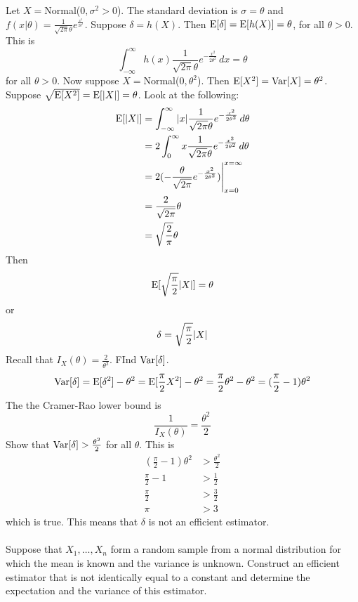 \documentclass[12pt]{article}
\begin{document}
Let $X = $Normal($0,\sigma^2 > 0$). The standard deviation is $\sigma = \theta$ and $f(x | \theta) = \frac{1}{\sqrt{2\pi} \theta} e^{_\frac{x^2}{2\theta^2}}$. Suppose $\delta = h(X)$. Then $\mathrm{E}[ \delta ] = \mathrm{E}[ h(X) ] = \theta$, for all $\theta > 0$. This is $$ \int_{-\infty}^\infty h(x) \frac{1}{\sqrt{2\pi} \theta} e^{-\frac{x^2}{2\theta^2}} \, dx = \theta$$ for all $\theta > 0$. Now suppose $X = $Normal($0, \theta^2$). Then $\mathrm{E}[ X^2 ] = \mathrm{Var}[ X ] = \theta^2$. Suppose $\sqrt{\mathrm{E}[ X^2 ]} = \mathrm{E}[ \abs{X} ] = \theta$. Look at the following: $$ \begin{aligned} \mathrm{E}[ \abs{X} ] &= \int_{-\infty}^\infty \abs{x} \frac{1}{\sqrt{2\pi} \theta} e^{-\frac{x^2}{2\theta^2}} \, d\theta \\ &= 2\int_0^\infty x \frac{1}{\sqrt{2\pi} \theta}e^{-\frac{x^2}{2\theta^2}} \, d\theta \\ &= 2( -\frac{\theta}{\sqrt{2\pi}} e^{-\frac{x^2}{2\theta^2}})\Bigg|_{x=0}^{x=\infty} \\ &= \frac{2}{\sqrt{2\pi}} \theta \\ &= \sqrt{\frac{2}{\pi}} \theta \end{aligned} $$ Then $$ \mathrm{E}[ \sqrt{\frac{\pi}{2}} \abs{X} ] = \theta $$ or $$ \delta = \sqrt{\frac{\pi}{2}}\abs{X} $$ Recall that $I_X(\theta) = \frac{2}{\theta^2}$. FInd $\mathrm{Var}[ \delta ]$. $$ \mathrm{Var}[ \delta ] = \mathrm{E}[ \delta^2 ] - \theta^2 = \mathrm{E}[ \frac{\pi}{2}X^2 ] - \theta^2 = \frac{\pi}{2}\theta^2 - \theta^2 = (\frac{\pi}{2} - 1)\theta^2 $$ The the Cramer-Rao lower bound is $$ \frac{1}{I_X(\theta)} = \frac{\theta^2}{2}$$ Show that $\mathrm{Var}[ \delta ] > \frac{\theta^2}{2}$ for all $\theta$. This is $$ \begin{aligned} (\frac{\pi}{2} - 1)\theta^2 &> \frac{\theta^2}{2} \\ \frac{\pi}{2} - 1 &> \frac{1}{2} \\ \frac{\pi}{2} &> \frac{3}{2} \\ \pi &> 3 \end{aligned} $$ which is true. This means that $\delta$ is not an efficient estimator. \\~\\
Suppose that $X_1,\dots,X_n$ form a random sample from a normal distribution for which the mean is known and the variance is unknown. Construct an efficient estimator that is not identically equal to a constant and determine the expectation and the variance of this estimator. \\ 
\end{document}
